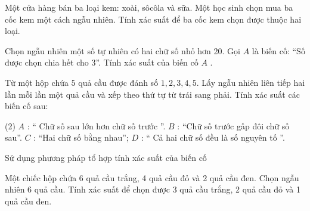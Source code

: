 \vspace{-0.8cm}
\begin{vd}
	Một cửa hàng bán ba loại kem: xoài,  sôcôla và sữa. Một học sinh chọn mua ba cốc kem một cách ngẫu nhiên. Tính xác suất để ba cốc kem chọn được thuộc hai loại.
\end{vd} 

\begin{vd}
	Chọn ngẫu nhiên một số tự nhiên có hai chữ số nhỏ hơn 20. Gọi $A$  là biến cố: “Số được chọn chia hết cho 3”. Tính xác suất của biến cố $A$ .
\end{vd} 

\begin{vd}
	Từ một hộp chứa $5$ quả cầu được đánh số $1,2,3,4,5$. Lấy ngẫu nhiên liên tiếp hai lần mỗi lần một quả cầu và xếp theo thứ tự từ trái sang phải. Tính xác suất các biến cố sau:
	\begin{tasks}(2)
		\task $A$ : “ Chữ số sau lớn hơn chữ số trước ”.
		\task $B$  : “Chữ số trước gấp đôi chữ số sau”.
		\task $C$ : “Hai chữ số bằng nhau”;
		\task $D$ : “ Cả hai chữ số đều là số nguyên tố ”.
	\end{tasks}
\end{vd} 

\begin{dang}{Sử dụng phương pháp tổ hợp tính xác suất của biến cố}
\end{dang}

\begin{vd}
	Một chiếc hộp chứa 6 quả cầu trắng, 4 quả cầu đỏ và 2 quả cầu đen. Chọn ngẫu nhiên 6 quả cầu. Tính xác suất để chọn được 3 quả cầu trắng, 2 quả cầu đỏ và 1 quả cầu đen.
\end{vd} 

